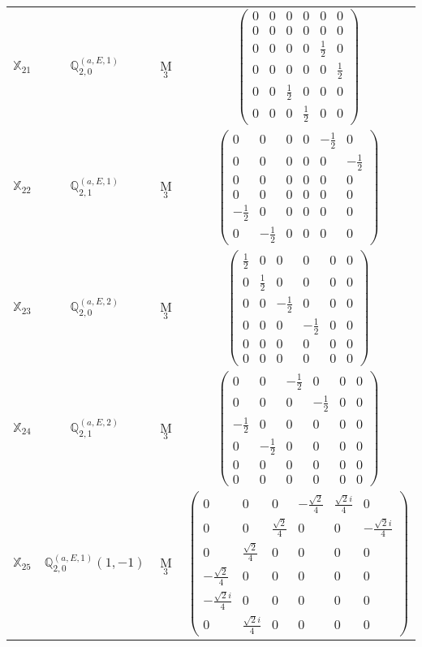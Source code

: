 \documentclass[fleqn,10pt,landscape]{article}
\begin{document}
\begin{itemize}
\begin{center}
\begin{longtable}{c|c|c|c}
$ \mathbb{X}_{21} $ & $\mathbb{Q}_{2,0}^{(a,E,1)}$ & M$_{3}$ & $\begin{pmatrix} 0 & 0 & 0 & 0 & 0 & 0 \\ 0 & 0 & 0 & 0 & 0 & 0 \\ 0 & 0 & 0 & 0 & \frac{1}{2} & 0 \\ 0 & 0 & 0 & 0 & 0 & \frac{1}{2} \\ 0 & 0 & \frac{1}{2} & 0 & 0 & 0 \\ 0 & 0 & 0 & \frac{1}{2} & 0 & 0 \end{pmatrix}$ \\
$ \mathbb{X}_{22} $ & $\mathbb{Q}_{2,1}^{(a,E,1)}$ & M$_{3}$ & $\begin{pmatrix} 0 & 0 & 0 & 0 & - \frac{1}{2} & 0 \\ 0 & 0 & 0 & 0 & 0 & - \frac{1}{2} \\ 0 & 0 & 0 & 0 & 0 & 0 \\ 0 & 0 & 0 & 0 & 0 & 0 \\ - \frac{1}{2} & 0 & 0 & 0 & 0 & 0 \\ 0 & - \frac{1}{2} & 0 & 0 & 0 & 0 \end{pmatrix}$ \\
$ \mathbb{X}_{23} $ & $\mathbb{Q}_{2,0}^{(a,E,2)}$ & M$_{3}$ & $\begin{pmatrix} \frac{1}{2} & 0 & 0 & 0 & 0 & 0 \\ 0 & \frac{1}{2} & 0 & 0 & 0 & 0 \\ 0 & 0 & - \frac{1}{2} & 0 & 0 & 0 \\ 0 & 0 & 0 & - \frac{1}{2} & 0 & 0 \\ 0 & 0 & 0 & 0 & 0 & 0 \\ 0 & 0 & 0 & 0 & 0 & 0 \end{pmatrix}$ \\
$ \mathbb{X}_{24} $ & $\mathbb{Q}_{2,1}^{(a,E,2)}$ & M$_{3}$ & $\begin{pmatrix} 0 & 0 & - \frac{1}{2} & 0 & 0 & 0 \\ 0 & 0 & 0 & - \frac{1}{2} & 0 & 0 \\ - \frac{1}{2} & 0 & 0 & 0 & 0 & 0 \\ 0 & - \frac{1}{2} & 0 & 0 & 0 & 0 \\ 0 & 0 & 0 & 0 & 0 & 0 \\ 0 & 0 & 0 & 0 & 0 & 0 \end{pmatrix}$ \\
$ \mathbb{X}_{25} $ & $\mathbb{Q}_{2,0}^{(a,E,1)}(1,-1)$ & M$_{3}$ & $\begin{pmatrix} 0 & 0 & 0 & - \frac{\sqrt{2}}{4} & \frac{\sqrt{2} i}{4} & 0 \\ 0 & 0 & \frac{\sqrt{2}}{4} & 0 & 0 & - \frac{\sqrt{2} i}{4} \\ 0 & \frac{\sqrt{2}}{4} & 0 & 0 & 0 & 0 \\ - \frac{\sqrt{2}}{4} & 0 & 0 & 0 & 0 & 0 \\ - \frac{\sqrt{2} i}{4} & 0 & 0 & 0 & 0 & 0 \\ 0 & \frac{\sqrt{2} i}{4} & 0 & 0 & 0 & 0 \end{pmatrix}$ \\

\end{longtable}
\end{center}
\end{itemize}
\end{document}

